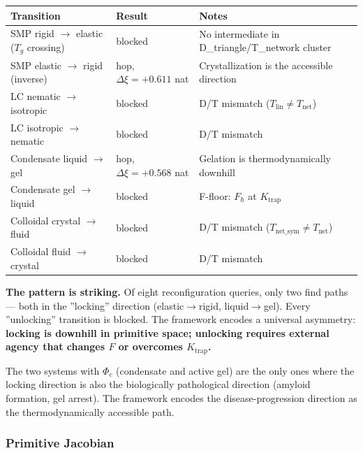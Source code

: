 \documentclass[12pt,a4paper]{article}
\begin{document}
\begin{table}[htbp]
\centering
\small
{}
\begin{tabularx}{\textwidth}{>{\centering\arraybackslash}X >{\centering\arraybackslash}X >{\centering\arraybackslash}X}
\toprule
\rowcolor{gray!25}\textbf{Transition} & \textbf{Result} & \textbf{Notes} \\
\midrule
\rowcolors{1}{white}{gray!10}
SMP rigid $\rightarrow$ elastic ($T_g$ crossing) &  blocked & No intermediate in D\_triangle/T\_network cluster \\
SMP elastic $\rightarrow$ rigid (inverse) &  1 hop, $\Delta\xi = +0.611$ nat & Crystallization is the accessible direction \\
LC nematic $\rightarrow$ isotropic &  blocked & D/T mismatch ($T_\text{lin} \neq T_\text{net}$) \\
LC isotropic $\rightarrow$ nematic &  blocked & D/T mismatch \\
Condensate liquid $\rightarrow$ gel &  1 hop, $\Delta\xi = +0.568$ nat & Gelation is thermodynamically downhill \\
Condensate gel $\rightarrow$ liquid &  blocked & F-floor: $F_\hbar$ at $K_\text{trap}$ \\
Colloidal crystal $\rightarrow$ fluid &  blocked & D/T mismatch ($T_\text{net\_sym} \neq T_\text{net}$) \\
Colloidal fluid $\rightarrow$ crystal &  blocked & D/T mismatch \\
\bottomrule
\end{tabularx}
\end{table}

\textbf{The pattern is striking.} Of eight reconfiguration queries, only two find paths --- both in the ''locking'' direction (elastic$\rightarrow$rigid, liquid$\rightarrow$gel). Every ''unlocking'' transition is blocked. The framework encodes a universal asymmetry: \textbf{locking is downhill in primitive space; unlocking requires external agency that changes $F$ or overcomes $K_\text{trap}$.}

The two systems with $\Phi_c$ (condensate and active gel) are the only ones where the locking direction is also the biologically pathological direction (amyloid formation, gel arrest). The framework encodes the disease-progression direction as the thermodynamically accessible path.

\subsubsection{Primitive Jacobian}
\end{document}
